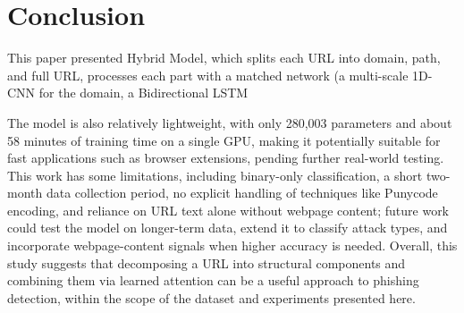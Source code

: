\documentclass[conference]{IEEEtran}
\begin{document}


\section{Conclusion}
This paper presented Hybrid Model, which splits each URL into domain, path, and full URL, processes each part with a matched network (a multi-scale 1D-CNN for the domain, a Bidirectional LSTM


The model is also relatively lightweight, with only 280,003 parameters and about 58 minutes of training time on a single GPU, making it potentially suitable for fast applications such as browser extensions, pending further real-world testing. This work has some limitations, including binary-only classification, a short two-month data collection period, no explicit handling of techniques like Punycode encoding, and reliance on URL text alone without webpage content; future work could test the model on longer-term data, extend it to classify attack types, and incorporate webpage-content signals when higher accuracy is needed. Overall, this study suggests that decomposing a URL into structural components and combining them via learned attention can be a useful approach to phishing detection, within the scope of the dataset and experiments presented here.
\end{document}
